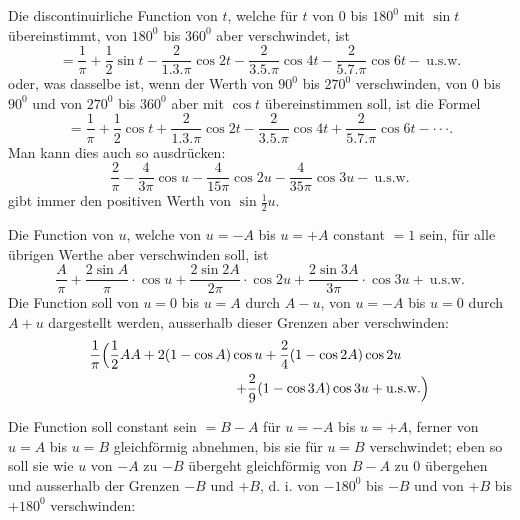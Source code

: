 \clearpage\NoSourceHead{}
\noindent\hspace*{\parindent}Die discontinuirliche Function von \(t\), welche für \(t\) von 0 bis \(180^0\) mit \(\sin t\) übereinstimmt, von \(180^0\) bis \(360^0\) aber verschwindet, ist
\[
=\frac1\pi+\frac12\sin t-\frac2{1{.}3{.}\pi}\cos2t-\frac2{3{.}5{.}\pi}\cos4t-\frac2{5{.}7{.}\pi}\cos6t-\ \text{u.s.w.}
\]
\noindent oder, was dasselbe ist, wenn der Werth von \(90^0\) bis \(270^0\) verschwinden, von 0 bis \(90^0\) und von \(270^0\) bis \(360^0\) aber mit \(\cos t\) übereinstimmen soll, ist die Formel
\[
=\frac1\pi+\frac12\cos t+\frac2{1{.}3{.}\pi}\cos2t-\frac2{3{.}5{.}\pi}\cos4t+\frac2{5{.}7{.}\pi}\cos6t-\mathord{\cdot}\,\mathord{\cdot}\,\mathord{\cdot}.
\]
\noindent Man kann dies auch so ausdrücken:
\[
\frac2\pi-\frac4{3\pi}\cos u-\frac4{15\pi}\cos2u-\frac4{35\pi}\cos3u-\ \text{u.s.w.}
\]
\noindent gibt immer den positiven Werth von \(\sin\frac12u\).
\ClosingRule
\par\bigskip\noindent\hspace*{\parindent}Die Function von \(u\), welche von \(u=-A\) bis \(u=+A\) constant \(=1\) sein, für alle übrigen Werthe aber verschwinden soll, ist
\[
\frac A\pi+\frac{2\sin A}\pi\cdot\cos u+\frac{2\sin2A}{2\pi}\cdot\cos2u+\frac{2\sin3A}{3\pi}\cdot\cos3u+\ \text{u.s.w.}
\]
\ClosingRule
\clearpage{}
\noindent\hspace*{\parindent}Die Function soll von \(u=0\) bis \(u=A\) durch \(A-u\), von \(u=-A\) bis \(u=0\) durch \(A+u\) dargestellt werden, ausserhalb dieser Grenzen aber verschwinden:
\[
\begin{aligned}
\frac1\pi\Bigl(\frac12AA+2(1-\cos A)\cos u+\frac24(1-\cos2A)\cos2u\qquad\\
+\frac29(1-\cos3A)\cos3u+\text{u.s.w.}\Bigr)
\end{aligned}
\]
\ClosingRule
\par\bigskip\noindent\hspace*{\parindent}Die Function soll constant sein \(=B-A\) für \(u=-A\) bis \(u=+A\), ferner von \(u=A\) bis \(u=B\) gleichförmig abnehmen, bis sie für \(u=B\) verschwindet; eben so soll sie wie \(u\) von \(-A\) zu \(-B\) übergeht gleichförmig von \(B-A\) zu 0 übergehen und ausserhalb der Grenzen \(-B\) und \(+B\), d. i. von \(-180^0\) bis \(-B\) und von \(+B\) bis \(+180^0\) verschwinden:
